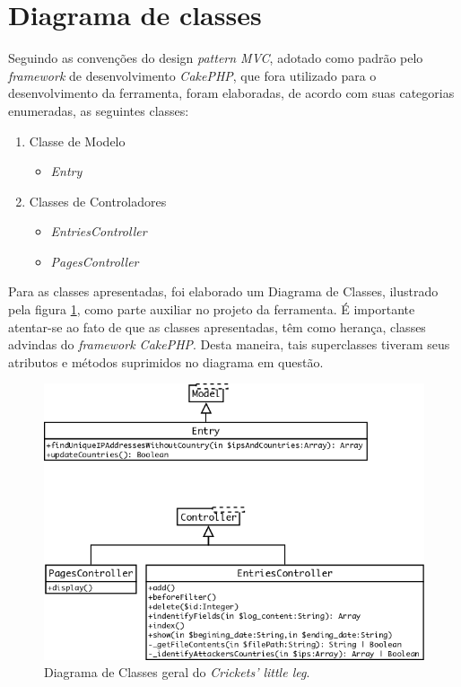 \clearpage
\section{Diagrama de classes}

Seguindo as convenções do design \textit{pattern MVC}, adotado como padrão pelo \textit{framework} de desenvolvimento \textit{CakePHP}, que fora utilizado para o desenvolvimento da ferramenta, foram elaboradas, de acordo com suas categorias enumeradas, as seguintes classes:

\begin{singlespacing}
\begin{enumerate}
    \item Classe de Modelo
        \begin{itemize}
            \item \textit{Entry}
        \end{itemize}
    \item Classes de Controladores
        \begin{itemize}
            \item \textit{EntriesController}
            \item \textit{PagesController}
        \end{itemize}
\end{enumerate}
\end{singlespacing}

Para as classes apresentadas, foi elaborado um Diagrama de Classes, ilustrado pela figura \ref{figura:dc-mvc}, como parte auxiliar no projeto da ferramenta. É importante atentar-se ao fato de que as classes apresentadas, têm como herança, classes advindas do \textit{framework CakePHP}. Desta maneira, tais superclasses tiveram seus atributos e métodos suprimidos no diagrama em questão.

\begin{figure}[hc]
    \begin{center}
        \includegraphics[scale=0.4]{./figuras/dc-mvc.png}

        \caption{\label{figura:dc-mvc}Diagrama de Classes geral do \textit{Crickets' little leg}.}
    \end{center}
\end{figure}

